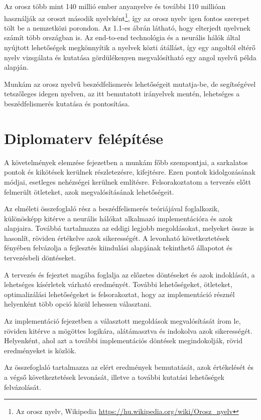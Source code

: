 Az orosz több mint 140 millió ember anyanyelve és további 110 millióan használják az oroszt második nyelvként\footnote{Az orosz nyelv, Wikipedia \url{https://hu.wikipedia.org/wiki/Orosz_nyelv}}, így az orosz nyelv igen fontos szerepet tölt be a nemzetközi porondon. Az 1.1-es ábrán látható, hogy elterjedt nyelvnek számít több országban is. Az end-to-end technológia és a neurális hálók által nyújtott lehetőségek megkönnyítik a nyelvek közti átállást, így egy angoltól eltérő nyelv vizsgálata és kutatása gördülékenyen megvalósítható egy angol nyelvű példa alapján.

Munkám az orosz nyelvű beszédfelismerés lehetőségeit mutatja-be, de segítségével tetszőleges idegen nyelven, az itt bemutatott irányelvek mentén, lehetséges a beszédfelismerés kutatása és pontosítása.

\section{Diplomaterv felépítése}

A követelmények elemzése fejezetben a munkám főbb szempontjai, a sarkalatos pontok és kikötések kerülnek részletezésre, kifejtésre. Ezen pontok kidolgozásának módjai, esetleges nehézségei kerülnek említésre. Felsorakoztatom a tervezés előtt felmerült ötleteket, azok megvalósításának lehetőségeit.

Az elméleti összefoglaló rész a beszédfelismerés teóriájával foglalkozik, különösképp kitérve a neurális hálókat alkalmazó implementációra és azok alapjaira. Továbbá tartalmazza az eddigi legjobb megoldásokat, melyeket össze is hasonlít, röviden értékelve azok sikerességét. A levonható következtetések fényében felvázolja a fejlesztés kiindulási alapjának tekinthető állapotot és tervezésbeli döntéseket.

A tervezés és fejeztet magába foglalja az előzetes döntéseket és azok indoklását, a lehetséges kísérletek várható eredményét. További lehetőségeket, ötleteket, optimalizálási lehetőségeket is felsorakoztat, hogy az implementáció résznél helyenként több opció közül lehessen választani.

Az implementáció fejezetben a választott megoldások megvalósítását írom le, röviden kitérve a mögöttes logikára, alátámasztva és indokolva azok sikerességét. Helyenként, ahol azt a további implementációs döntések megindokolják, rövid eredményeket is közlök.

Az összefoglaló tartalmazza az elért eredmények bemutatását, azok értékelését és a végső következtetések levonását, illetve a további kutatási lehetőségek felvázolását.